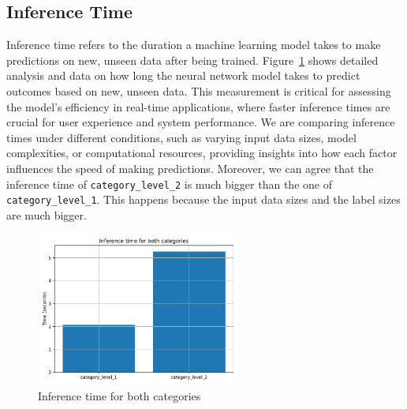 \subsection{Inference Time}
Inference time refers to the duration a machine learning model takes to make predictions on new, unseen data after being trained. Figure~\ref{fig:inference_time} shows detailed analysis and data on how long the neural network model takes to predict outcomes based on new, unseen data. This measurement is critical for assessing the model's efficiency in real-time applications, where faster inference times are crucial for user experience and system performance. We are comparing inference times under different conditions, such as varying input data sizes, model complexities, or computational resources, providing insights into how each factor influences the speed of making predictions.
Moreover, we can agree that the inference time of \verb*|category_level_2| is much bigger than the one of \verb*|category_level_1|. This happens because the input data sizes and the label sizes are much bigger. 

\begin{figure}[htpb]
	\centering
	\includegraphics[width=0.6\textwidth]{Images/eval_inference_time.pdf}
	\caption{Inference time for both categories}
	\label{fig:inference_time}
\end{figure} 
